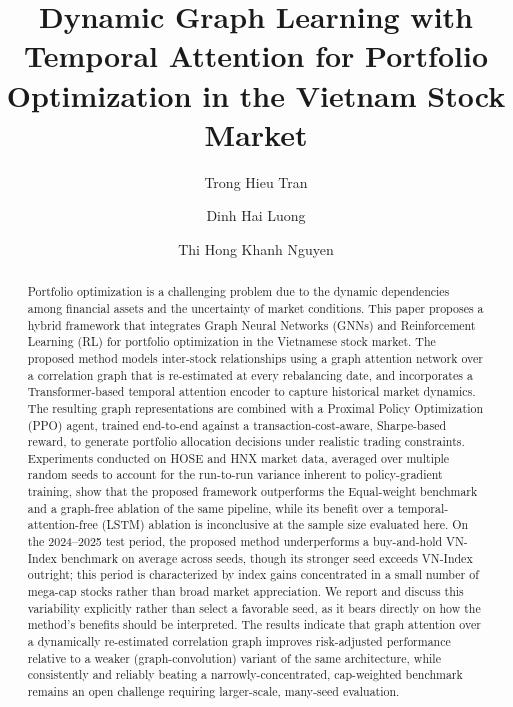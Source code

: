 \documentclass[runningheads]{llncs}
\begin{document}
\title{Dynamic Graph Learning with Temporal Attention for Portfolio Optimization in the Vietnam Stock Market}

\author{Trong Hieu Tran \and
       Dinh Hai Luong \and
       Thi Hong Khanh Nguyen}


\maketitle

\begin{abstract}
Portfolio optimization is a challenging problem due to the dynamic dependencies among financial assets and the uncertainty of market conditions. This paper proposes a hybrid framework that integrates Graph Neural Networks (GNNs) and Reinforcement Learning (RL) for portfolio optimization in the Vietnamese stock market. The proposed method models inter-stock relationships using a graph attention network over a correlation graph that is re-estimated at every rebalancing date, and incorporates a Transformer-based temporal attention encoder to capture historical market dynamics. The resulting graph representations are combined with a Proximal Policy Optimization (PPO) agent, trained end-to-end against a transaction-cost-aware, Sharpe-based reward, to generate portfolio allocation decisions under realistic trading constraints. Experiments conducted on HOSE and HNX market data, averaged over multiple random seeds to account for the run-to-run variance inherent to policy-gradient training, show that the proposed framework outperforms the Equal-weight benchmark and a graph-free ablation of the same pipeline, while its benefit over a temporal-attention-free (LSTM) ablation is inconclusive at the sample size evaluated here. On the 2024--2025 test period, the proposed method underperforms a buy-and-hold VN-Index benchmark on average across seeds, though its stronger seed exceeds VN-Index outright; this period is characterized by index gains concentrated in a small number of mega-cap stocks rather than broad market appreciation. We report and discuss this variability explicitly rather than select a favorable seed, as it bears directly on how the method's benefits should be interpreted. The results indicate that graph attention over a dynamically re-estimated correlation graph improves risk-adjusted performance relative to a weaker (graph-convolution) variant of the same architecture, while consistently and reliably beating a narrowly-concentrated, cap-weighted benchmark remains an open challenge requiring larger-scale, many-seed evaluation.
\end{abstract}
\end{document}
